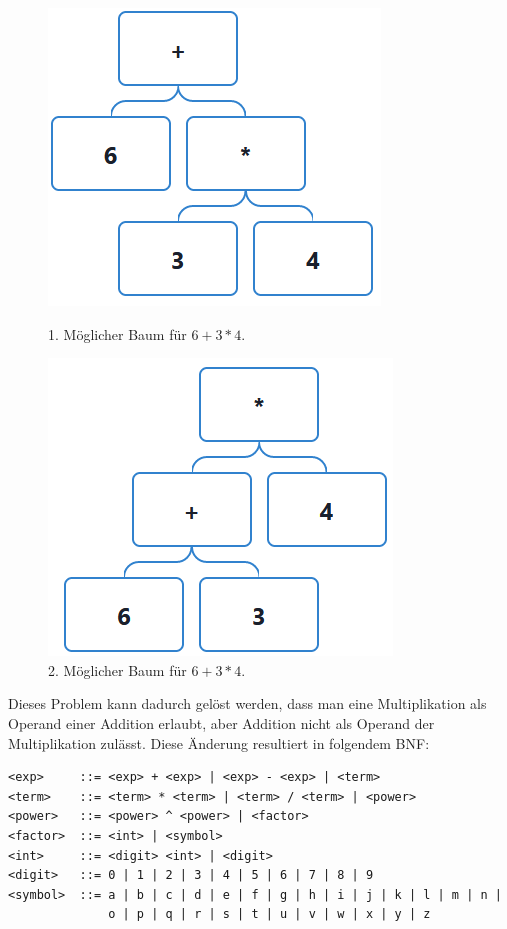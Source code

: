 \documentclass[11pt]{article}
\begin{document}
\begin{figure}[h]
\begin{minipage}{.5\textwidth}
  \centering
  \includegraphics[scale=0.5]{trees/beispiel_bnf_2_1.png}
  \caption{1. Möglicher Baum für $6+3*4$.}
\end{minipage}
\begin{minipage}{.5\textwidth}
  \centering
  \includegraphics[scale=0.5]{trees/beispiel_bnf_2_2.png}
  \caption{2. Möglicher Baum für $6+3*4$.}
\end{minipage}
\end{figure}

Dieses Problem kann dadurch gelöst werden, dass man eine Multiplikation als 
Operand einer Addition erlaubt, aber Addition nicht als Operand der Multiplikation 
zulässt. Diese Änderung resultiert in folgendem BNF:

\begin{verbatim}
<exp>     ::= <exp> + <exp> | <exp> - <exp> | <term>
<term>    ::= <term> * <term> | <term> / <term> | <power>
<power>   ::= <power> ^ <power> | <factor>
<factor>  ::= <int> | <symbol>
<int>     ::= <digit> <int> | <digit>
<digit>   ::= 0 | 1 | 2 | 3 | 4 | 5 | 6 | 7 | 8 | 9
<symbol>  ::= a | b | c | d | e | f | g | h | i | j | k | l | m | n | 
              o | p | q | r | s | t | u | v | w | x | y | z
\end{verbatim}
\end{document}
